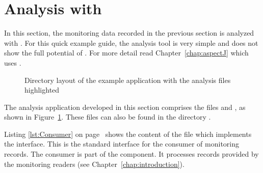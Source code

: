 \section{Analysis with \KiekerAnalysisPart{}}\label{sec:example:analysis}

In this section, the monitoring data recorded in the previous section is %
analyzed with \KiekerAnalysisPart{}. %
For this quick example guide, the analysis tool is very simple and does not show %
the full potential of \Kieker{}. For more detail read Chapter~\ref{chap:aspectJ} %
which uses \KiekerTraceAnalysis{}.

\begin{figure}[H]
\begin{graybox}
\end{graybox}
\caption{Directory layout of the example application with the analysis files highlighted}
\label{lst:analysisExampleLayout}
\end{figure}

\noindent The analysis application developed in this section comprises the files %
 and , as shown in Figure~\ref{lst:analysisExampleLayout}. %
These files can also be found in the directory \dir{\manualInstrumentedBookstoreApplicationDirDistro{}/}. 

Listing \ref{lst:Consumer} on page~\pageref{lst:Consumer} shows the content of the  file which implements the  interface. This is the standard interface for the consumer of \Kieker{} monitoring records. The consumer is part of the \KiekerAnalysisPart{} component. It processes records provided by the monitoring readers (see Chapter~\ref{chap:introduction}). %

